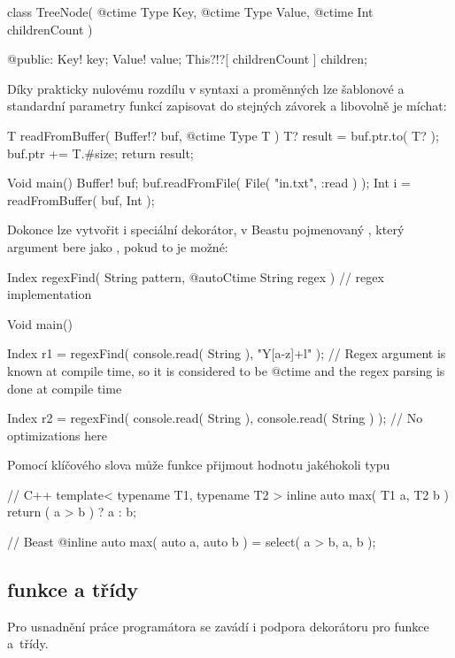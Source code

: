 \begin{code}
class TreeNode( @ctime Type Key, @ctime Type Value, @ctime Int childrenCount ) {
	
@public:
	Key! key;
	Value! value;
	This?!?[ childrenCount ] children;
	
}
\end{code}

Díky prakticky nulovému rozdílu v syntaxi \ctime a \nonctime proměnných lze šablonové a standardní parametry funkcí zapisovat do stejných závorek a libovolně je míchat:
\begin{code}
T readFromBuffer( Buffer!? buf, @ctime Type T ) {
	T? result = buf.ptr.to( T? );
	buf.ptr += T.#size;
	return result;
}

Void main() {
	Buffer! buf;
	buf.readFromFile( File( "in.txt", :read ) ); 
	Int i = readFromBuffer( buf, Int );
}
\end{code}

Dokonce lze vytvořit i speciální dekorátor, v Beastu pojmenovaný , který argument bere jako \ctime, pokud to je možné:
\begin{code}
Index regexFind( String pattern, @autoCtime String regex ) {
	// regex implementation
}

Void main() {
	Index r1 = regexFind( console.read( String ), "Y[a-z]+l" ); // Regex argument is known at compile time, so it is considered to be @ctime and the regex parsing is done at compile time
	
	Index r2 = regexFind( console.read( String ), console.read( String ) ); // No optimizations here
}
\end{code}

Pomocí klíčového slova  může funkce přijmout hodnotu jakéhokoli typu
\begin{cppcode}
// C++
template< typename T1, typename T2 >
inline auto max( T1 a, T2 b ) {
	return ( a  > b ) ? a : b;
}
\end{cppcode}

\begin{code}
// Beast
@inline auto max( auto a, auto b ) = select( a > b, a, b );
\end{code}

\subsection{\ctime funkce a třídy}
Pro usnadnění práce programátora se zavádí i podpora dekorátoru  pro funkce a~třídy.


